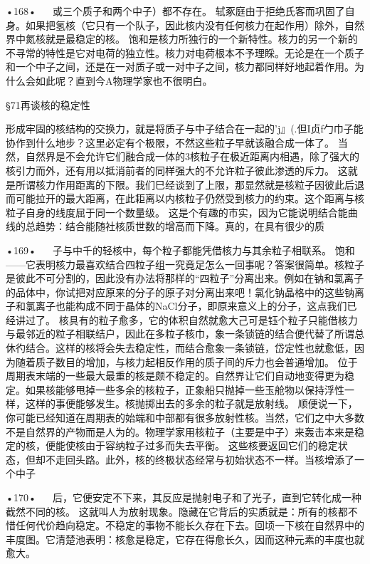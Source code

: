 •168•
  
或三个质子和两个中子）都不存在。
轼豖庭由于拒绝氏客而巩固了自身。如果把氢核（它只有一个队子，因此核内没有任何核力在起作用）除外，自然界中氮核就是最稳定的核。
饱和是核力所独行的一个新特性。核力的另一个新的不寻常的特性是它对电荷的独立性。核力对电荷根本不予理睬。无论是在一个质子和一个中子之间，还是在一对质子或一对中子之间，核力都同样好地起着作用。为什么会如此呢？直到今A物理学家也不很明白。

§71再谈核的稳定性

形成牢固的核结构的交换力，就是将质子与中子结合在一起的'j』(.但I贞f勹巾子能协作到什么地步？这里必定有个极限，不然这些粒子早就该融合成一体了。
当然，自然界是不会允许它们融合成一体的3核粒子在极近距离内相遇，除了强大的核引力而外，还有用以抵消前者的同样强大的不允许粒子彼此渗透的斥力。
这就是所谓核力作用距离的下限。我们巳经谈到了上限，那显然就是核粒子因彼此后退而可能拉开的最大距离，在此耟离以内核粒子仍然受到核力的约束。这个距离与核粒子自身的线度屈于同一个数量级。
这是个有趣的市实，因为它能说明结合能曲线的总趋势：结合能随社核质世数的增高而下降。真的，在具有很少的质

•169•
  
子与中千的轻核中，每个粒子都能凭借核力与其余粒子相联系。
饱和——它表明核力最喜欢结合四粒子组一究竟足怎么一回事呢？答案很简单。核粒子是彼此不可分割的，因此没有办法将那样的“四粒子”分离出来。例如在钠和氯离子的品体中，你试把对应原来的分子的原子对分离出来吧！氯化钠晶格中的这些钠离子和氯离子也能构成不同于晶体的NaCl分子，即原来意义上的分子，这点我们已经讲过了。
核具有的粒子愈多，它的体积自然就愈大己可是钰个粒子只能借核力与最邻近的粒子相联结户，因此在多粒子核巾，象一条锁链的结合便代替了所谓总休彴结合。这样的核将会失去稳定性，而结合愈象一条锁链，岱定性也就愈低，因为随着质子数目的增加，与核力起相反作用的质子间的斥力也会普通增加。
位于周期表末端的一些最大最重的核是颇不稳定的。自然界让它们自动地变得更为稳定。如果核能够甩掉一些多余的核粒子，正象船只抛掉一些玉舱物以保持浮性一样，这样的事便能够发生。核抛掷出去的多余的粒子就是放射线。
顺便说一下，你可能已经知道在周期表的始端和中部都有很多放射性核。当然，它们之中大多数不是自然界的产物而是人为的。物理学家用核粒子（主要是中子）来轰击本来是稳定的核，便能使核由于容纳粒子过多而失去平衡。
这些核要返回它们的稳定状态，但却不走回头路。此外，核的终极状态经常与初始状态不一样。当核增添了一个中子

•170•
  
后，它便安定不下来，其反应是抛射电子和了光子，直到它转化成一种截然不同的核。
这就叫人为放射现象。隐藏在它背后的实质就是：所有的核都不惜任何代价趋向稳定。不稳定的事物不能长久存在下去。回顷一下核在自然界中的丰度图。它清楚池表明：核愈是稳定，它存在得愈长久，因而这种元素的丰度也就愈大。

